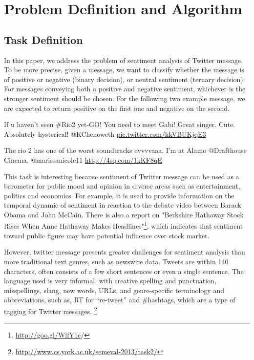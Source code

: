\section{Problem Definition and Algorithm}
\label{sec:def}

\subsection{Task Definition}
In this paper, we address the problem of sentiment analysis of Twitter message. To be more precise, 
given a message, we want to classify whether the message is of positive or negative (binary decision), or neutral sentiment (ternary decision). For messages conveying both a positive and negative sentiment, whichever is the stronger sentiment should be chosen. For the following two example message, we are expected to return positive on the first one and negative on the second. 
\begin{mdframed}[
  leftmargin=\parindent,
  rightmargin=\parindent,
  skipabove=\topsep,
  skipbelow=\topsep
  ]
  If u haven't seen \#Rio2 yet-GO! You need to meet Gabi! Great singer. Cute. Absolutely hysterical! @KChenoweth \url{pic.twitter.com/kkVBUKjqE3}
\end{mdframed}

\begin{mdframed}[
  leftmargin=\parindent,
  rightmargin=\parindent,
  skipabove=\topsep,
  skipbelow=\topsep
  ]
 The rio 2 has one of the worst soundtracks evvvvaaa. I'm at Alamo @Drafthouse Cinema. @marissanicole11 \url{http://4sq.com/1kKF8qE} 
\end{mdframed}

This task is interesting because sentiment of Twitter message can be used as a barometer for public mood and opinion in diverse areas such as entertainment, politics and economics. For example, 
it is used to provide information on the temporal dynamic of sentiment in reaction to the debate video between Barack Obama and John McCain\cite{Diakopoulos:2010}. 
There is also a report on "Berkshire Hathaway Stock Rises When Anne Hathaway Makes Headlines"\footnote{\url{http://goo.gl/WlfY1c}/}, which indicates that sentiment toward public figure may have potential influence over stock market. 

However, twitter message presents greater challenges for sentiment analysis than more traditional text genres, such as newswire data.  Tweets are within 140 characters, often consists of a few short sentences or even a single sentence. 
The language used is very informal, with creative spelling and punctuation, misspellings, slang, new words, URLs, and genre-specific terminology and abbreviations, such as, RT for “re-tweet” and \#hashtags, which are a type of tagging for Twitter messages. \footnote{\url{http://www.cs.york.ac.uk/semeval-2013/task2/}}


